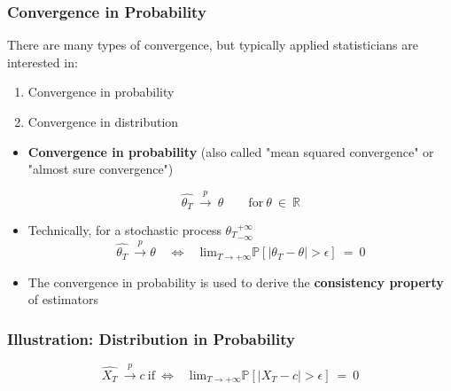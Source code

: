 \documentclass{beamer}
\begin{document}
  \begin{frame}
    \frametitle{Convergence in Probability}
    There are many types of convergence, but typically applied statisticians are interested in:
   
    \begin{enumerate}
      \item Convergence in probability
      \item Convergence in distribution
    \end{enumerate}

    \begin{itemize}
\item  \textbf{Convergence in probability} (also called "mean squared convergence" or "almost sure convergence")

  \begin{equation*}
    \hat{\theta_T} \ \overset{p}{\to} \ \theta \qquad \text{for} \ \theta \ \in \ \mathbb{R}
  \end{equation*}

\item Technically, for a stochastic process ${\theta_T}_{-\infty}^ {+\infty}$
  \begin{equation*}
  \hat{\theta_T} \ \overset{p}{\to} \theta \quad \Leftrightarrow \quad \text{lim}_{T \to +\infty} \mathbb{P} \left[ |\theta_T - \theta| > \epsilon \right] \ = \ 0 
  \end{equation*}
    
\item The convergence in probability is used to derive the \textbf{consistency property} of estimators
    \end{itemize}
    
  \end{frame}


  \begin{frame}
    \frametitle{Illustration: Distribution in Probability}
    
    \begin{equation*}
\hat{X_T} \ \overset{p}{\to} c \ \text{if} \ \Leftrightarrow \quad \text{lim}_{T \to +\infty} \mathbb{P} \left[ |X_T - c| > \epsilon \right] \ = \ 0      
    \end{equation*}
    
    
  \end{frame}
\end{document}
